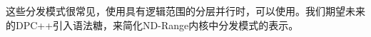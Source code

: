 这些分发模式很常见，使用具有逻辑范围的分层并行时，可以使用。我们期望未来的DPC++引入语法糖，来简化ND-Range内核中分发模式的表示。\par


































